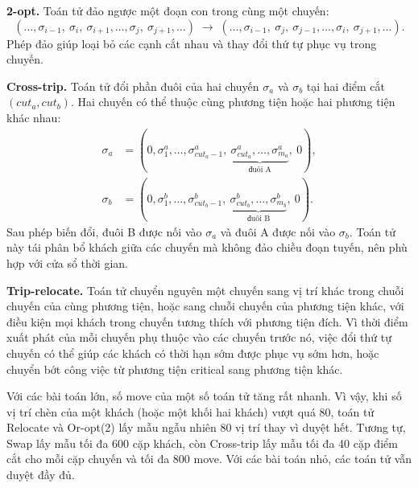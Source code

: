 \documentclass[../DoAn.tex]{subfiles}
\begin{document}
\textbf{2-opt.} Toán tử đảo ngược một đoạn con trong cùng một chuyến:
\begin{equation*}
(\ldots, \sigma_{i-1},\ \sigma_i,\ \sigma_{i+1},\ldots, \sigma_j,\ \sigma_{j+1},\ldots)
\;\longrightarrow\;
(\ldots, \sigma_{i-1},\ \sigma_j,\ \sigma_{j-1},\ldots, \sigma_i,\ \sigma_{j+1},\ldots).
\end{equation*}
Phép đảo giúp loại bỏ các cạnh cắt nhau và thay đổi thứ tự phục vụ trong chuyến.

\textbf{Cross-trip.} Toán tử đổi phần đuôi của hai chuyến $\sigma_a$ và $\sigma_b$ tại hai điểm cắt $(\mathit{cut}_a, \mathit{cut}_b)$. Hai chuyến có thể thuộc cùng phương tiện hoặc hai phương tiện khác nhau:
\begin{align*}
\sigma_a &= (0, \sigma^a_1, \ldots, \sigma^a_{\mathit{cut}_a - 1},\ \underbrace{\sigma^a_{\mathit{cut}_a}, \ldots, \sigma^a_{m_a}}_{\text{đuôi A}},\ 0), \\
\sigma_b &= (0, \sigma^b_1, \ldots, \sigma^b_{\mathit{cut}_b - 1},\ \underbrace{\sigma^b_{\mathit{cut}_b}, \ldots, \sigma^b_{m_b}}_{\text{đuôi B}},\ 0).
\end{align*}
Sau phép biến đổi, đuôi B được nối vào $\sigma_a$ và đuôi A được nối vào $\sigma_b$. Toán tử này tái phân bổ khách giữa các chuyến mà không đảo chiều đoạn tuyến, nên phù hợp với cửa sổ thời gian.

\textbf{Trip-relocate.} Toán tử chuyển nguyên một chuyến sang vị trí khác trong chuỗi chuyến của cùng phương tiện, hoặc sang chuỗi chuyến của phương tiện khác, với điều kiện mọi khách trong chuyến tương thích với phương tiện đích. Vì thời điểm xuất phát của mỗi chuyến phụ thuộc vào các chuyến trước nó, việc đổi thứ tự chuyến có thể giúp các khách có thời hạn sớm được phục vụ sớm hơn, hoặc chuyển bớt công việc từ phương tiện critical sang phương tiện khác.

Với các bài toán lớn, số move của một số toán tử tăng rất nhanh. Vì vậy, khi số vị trí chèn của một khách (hoặc một khối hai khách) vượt quá 80, toán tử Relocate và Or-opt(2) lấy mẫu ngẫu nhiên 80 vị trí thay vì duyệt hết. Tương tự, Swap lấy mẫu tối đa 600 cặp khách, còn Cross-trip lấy mẫu tối đa 40 cặp điểm cắt cho mỗi cặp chuyến và tối đa 800 move. Với các bài toán nhỏ, các toán tử vẫn duyệt đầy đủ.
\end{document}
